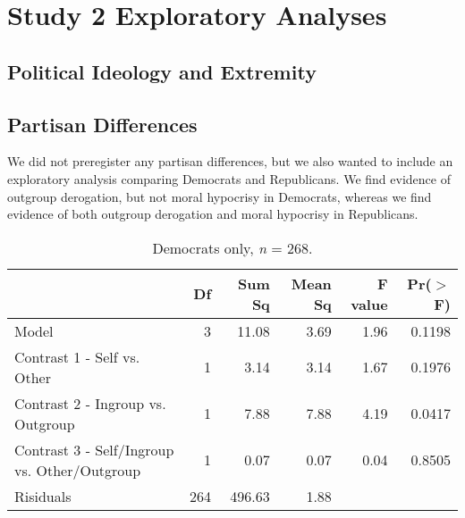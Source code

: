 \documentclass[12pt,]{article}
\begin{document}


\clearpage
\section{Study 2 Exploratory Analyses}
\label{appendix:explore2}



\subsection{Political Ideology and Extremity}
\label{appendix:ideo_extrem2}



\clearpage
\subsection{Partisan Differences}
\label{appendix:p_dif2}

We did not preregister any partisan differences, but we also wanted to include an exploratory analysis comparing Democrats and Republicans.  We find evidence of outgroup derogation, but not moral hypocrisy in Democrats, whereas we find evidence of both outgroup derogation and moral hypocrisy in Republicans. 

\vspace{0.6cm}

\begin{table}[ht]
\centering
\begin{tabular}{lrrrrr}
  \hline
 & Df & Sum Sq & Mean Sq & F value & Pr($>$F) \\ 
  \hline
Model & 3 & 11.08 & 3.69 & 1.96 & 0.1198 \\ 
  Contrast 1 - Self vs. Other & 1 & 3.14 & 3.14 & 1.67 & 0.1976 \\ 
  Contrast 2 - Ingroup vs. Outgroup & 1 & 7.88 & 7.88 & 4.19 & 0.0417 \\ 
  Contrast 3 - Self/Ingroup vs. Other/Outgroup & 1 & 0.07 & 0.07 & 0.04 & 0.8505 \\ 
  Risiduals & 264 & 496.63 & 1.88 &  &  \\ 
   \hline
\end{tabular}
\caption{Democrats only, \emph{n} = 268.} 
\label{dems2}
\end{table}
\end{document}
